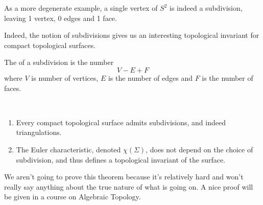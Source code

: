 \begin{example}
\begin{center}

\end{center}

As a more degenerate example, a single vertex of $S^2$ is indeed a subdivision, leaving 1 vertex, 0 edges and 1 face.
\end{example}

Indeed, the notion of subdivisions gives us an interesting topological invariant for compact topological surfaces.

\begin{definition}
    The  of a subdivision is the number 
    $$
    V - E + F
    $$
    where $V$ is number of vertices, $E$ is the number of edges and $F$ is the number of faces.
\end{definition}

\begin{theorem}~
    \vspace*{-1.5\baselineskip}
\begin{enumerate}[label=(\roman*)]
    \item Every compact topological surface admits subdivisions, and indeed triangulations.
    \item The Euler characteristic, denoted $\chi(\Sigma)$, does not depend on the choice of subdivision, and thus defines a topological invariant of the surface.
\end{enumerate}
\end{theorem}

We aren't going to prove this theorem because it's relatively hard and won't really say anything about the true nature of what is going on.
A nice proof will be given in a course on Algebraic Topology.

